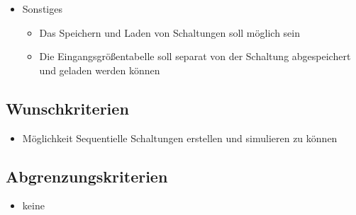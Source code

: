 \begin{itemize}
	\item Sonstiges
	
	\begin{itemize}
		\item Das Speichern und Laden von Schaltungen soll möglich sein
		\item Die Eingangsgrößentabelle soll separat von der Schaltung abgespeichert und geladen werden können
	\end{itemize}
	
\end{itemize}

\subsection{Wunschkriterien}

\begin{itemize}
	\item Möglichkeit Sequentielle Schaltungen erstellen und simulieren zu können
\end{itemize}

\subsection{Abgrenzungskriterien}

\begin{itemize}
	\item keine
\end{itemize}
